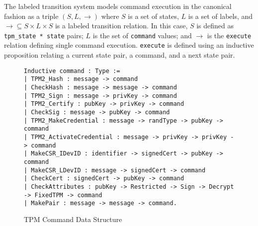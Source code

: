 \documentclass[runningheads]{llncs}
\begin{document}
The labeled transition system models command execution in the
canonical fashion as a triple $(S,L,\rightarrow)$ where $S$ is a set
of states, $L$ is a set of labels, and
$\rightarrow \subseteq S \times L \times S$ is a labeled transition
relation.  In this case, $S$ is defined as \verb|tpm_state * state|
pairs; $L$ is the set of \verb|command| values; and $\rightarrow$ is
the \verb|execute| relation defining single command execution.
\verb|execute| is defined using an inductive proposition relating a
current state pair, a command, and a next state pair.



\begin{figure}[hbtp]
  \begin{footnotesize}
\begin{lstlisting}[language=Coq]
Inductive command : Type :=
| TPM2_Hash : message -> command
| CheckHash : message -> message -> command
| TPM2_Sign : message -> privKey -> command
| TPM2_Certify : pubKey -> privKey -> command
| CheckSig : message -> pubKey -> command
| TPM2_MakeCredential : message -> randType -> pubKey -> command
| TPM2_ActivateCredential : message -> privKey -> privKey -> command
| MakeCSR_IDevID : identifier -> signedCert -> pubKey -> command
| MakeCSR_LDevID : message -> signedCert -> command
| CheckCert : signedCert -> pubKey -> command
| CheckAttributes : pubKey -> Restricted -> Sign -> Decrypt -> FixedTPM -> command
| MakePair : message -> message -> command.
\end{lstlisting}
\end{footnotesize}
\caption{TPM Command Data Structure}
\label{fig:command-model}
\end{figure}
\end{document}
